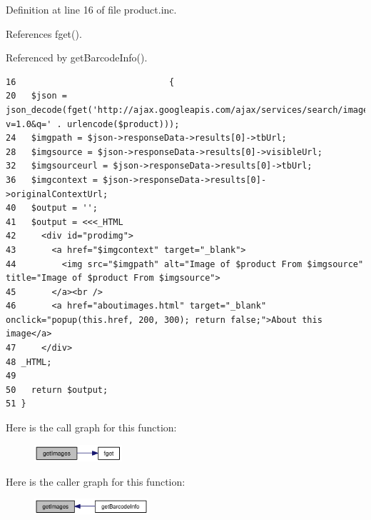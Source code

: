 Definition at line 16 of file product.inc.

References fget().

Referenced by getBarcodeInfo().

\begin{Code}\begin{verbatim}16                              {
20   $json = json_decode(fget('http://ajax.googleapis.com/ajax/services/search/images?v=1.0&q=' . urlencode($product)));
24   $imgpath = $json->responseData->results[0]->tbUrl;
28   $imgsource = $json->responseData->results[0]->visibleUrl;
32   $imgsourceurl = $json->responseData->results[0]->tbUrl;
36   $imgcontext = $json->responseData->results[0]->originalContextUrl;
40   $output = '';
41   $output = <<<_HTML
42     <div id="prodimg">
43       <a href="$imgcontext" target="_blank">
44         <img src="$imgpath" alt="Image of $product From $imgsource" title="Image of $product From $imgsource">
45       </a><br />
46       <a href="aboutimages.html" target="_blank" onclick="popup(this.href, 200, 300); return false;">About this image</a>
47     </div>
48 _HTML;
49 
50   return $output;
51 }\end{verbatim}
\end{Code}




Here is the call graph for this function:\nopagebreak
\begin{figure}[H]
\begin{center}
\leavevmode
\includegraphics[width=92pt]{product_8inc_9dbb778854cfe105058d7161ca8f058c_cgraph}
\end{center}
\end{figure}


Here is the caller graph for this function:\nopagebreak
\begin{figure}[H]
\begin{center}
\leavevmode
\includegraphics[width=120pt]{product_8inc_9dbb778854cfe105058d7161ca8f058c_icgraph}
\end{center}
\end{figure}
